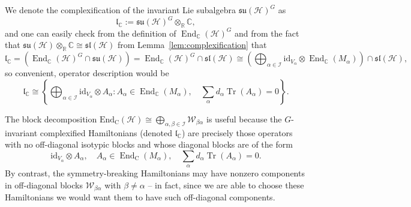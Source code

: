 \documentclass[10pt,twocolumn,superscriptaddress,aps,amsmath,amssymb,citeautoscript,floatfix,prx]{revtex4-2}
\newcounter{alg}
\theoremstyle{plain}
\theoremstyle{plain}
\theoremstyle{plain}
\theoremstyle{plain}
\theoremstyle{plain}
\theoremstyle{plain}
\newcommand{\C}{\mathbb{C}}
\newcommand{\R}{\mathbb{R}}
\newcommand{\HH}{\mathcal{H}}
\theoremstyle{plain}
\theoremstyle{definition}
\theoremstyle{plain}
\begin{document}
\begin{appendix}
We denote the complexification of the invariant Lie subalgebra $\mathfrak{su}(\HH)^G$ as
\[
    \mathfrak{l}_\C := \mathfrak{su}(\HH)^G \otimes_{\R} \C,
\]
and one can easily check from the definition of $\operatorname{End}_{\C}(\HH)^G$ and from the fact that $\mathfrak{su}(\HH) \otimes_{\R} \C \cong \mathfrak{sl}(\HH)$ from Lemma~\ref{lem:complexification} that
\begin{equation*}
    \mathfrak{l}_\C = \left(\operatorname{End}_{\C}(\HH)^G \cap \mathfrak{su}(\HH) \right) = \operatorname{End}_{\C}(\HH)^G\cap \mathfrak{sl}(\HH)\cong\left(\bigoplus_{\alpha \in \mathcal{I}} \mathrm{id}_{V_\alpha} \otimes \operatorname{End}_{ \mathbb{C}}\left(M_\alpha\right)\right) \cap \mathfrak{sl}(\HH),
\end{equation*}
so convenient, operator description would be
\begin{equation}\label{eq:compl_inv_alg}
    \mathfrak{l}_\C \cong \left\{\bigoplus_{\alpha \in \mathcal{I}} \mathrm{id}_{V_\alpha} \otimes A_\alpha: A_\alpha \in \operatorname{End}_\C(M_{\alpha}), \quad \sum_\alpha d_\alpha \operatorname{Tr}\left(A_\alpha\right)=0\right\}.
\end{equation}

The block decomposition
$
\text{End}_{\mathrm{C}}(\HH) \cong \bigoplus_{\alpha, \beta \in \mathcal{I}} \mathcal{W}_{\beta \alpha}
$
is useful because the $G$-invariant complexified Hamiltonians (denoted $\mathfrak{l}_\C$) are precisely those operators with no off-diagonal isotypic blocks and whose diagonal blocks are of the form
$$
\mathrm{id}_{V_\alpha} \otimes A_\alpha, \quad A_\alpha \in \operatorname{End}_{\mathrm{C}}\left(M_\alpha\right), \quad \sum_\alpha d_\alpha \operatorname{Tr}\left(A_\alpha\right)=0 .
$$
By contrast, the symmetry-breaking Hamiltonians may have nonzero components in off-diagonal blocks $\mathcal{W}_{\beta \alpha}$ with $\beta \neq \alpha$ -- in fact, since we are able to choose these Hamiltonians we would want them to have such off-diagonal components. 


\end{appendix}
\end{document}
